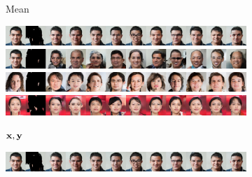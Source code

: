 \begin{figure}[t]
\begin{subfigure}[t]{0.1\textwidth}
    \caption{\scriptsize Mean}
  \end{subfigure}
  \caption{Examples of image completion tasks on which CoModGAN fails to model the semantic diversity in the distribution of possible completions. Panel
    (a) shows the true image and the masked version on which the completions are
    conditioned. Panel (b) shows 10 completions sampled randomly from the
    CoModGAN model. Panel (c) shows the mean image computed from 100 sampled
    completions. On each row, the completions are mostly semantically similar to
    eachother yet different from the ground truth image, indicating that they
    are not faithfully representing the true posterior. This behaviour can be
    contrasted with that of IPA in \cref{fig:cigcvae-comodgan-failure-aipo}.}
  \label{fig:cigcvae-comodgan-failure}
  \vspace{.5cm}
  \begin{subfigure}[t]{0.14\textwidth}
    \centering
    \includegraphics[trim=0px 0px 2560px 0px, clip, height=\cmgfailureimgheight]{figs/cigcvae/co_mod_gan_failure/aipo_0_3_2.jpg}
    \includegraphics[trim=0px 0px 2560px 0px, clip, height=\cmgfailureimgheight]{figs/cigcvae/co_mod_gan_failure/aipo_0_4_2.jpg}
    \includegraphics[trim=0px 0px 2560px 0px, clip, height=\cmgfailureimgheight]{figs/cigcvae/co_mod_gan_failure/aipo_1_4_2.jpg}
    \includegraphics[trim=0px 0px 2560px 0px, clip, height=\cmgfailureimgheight]{figs/cigcvae/co_mod_gan_failure/aipo_56_4_12.jpg}
    \caption{\scriptsize ${\mathbf{x}}, {\mathbf{y}}$}
  \end{subfigure}
  \begin{subfigure}[t]{0.73\textwidth}
    \centering
    \includegraphics[trim=512px 0px 0px 0px, clip, height=\cmgfailureimgheight]{figs/cigcvae/co_mod_gan_failure/aipo_0_3_2.jpg}

\end{subfigure}
\end{figure}
